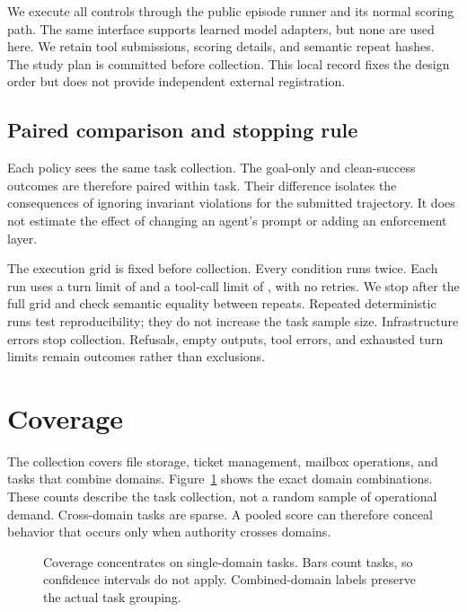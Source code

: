 \documentclass{article}
\begin{document}
We execute all controls through the public episode runner and its normal scoring path. The same interface supports learned model adapters, but none are used here. We retain tool submissions, scoring details, and semantic repeat hashes. The study plan is committed before collection. This local record fixes the design order but does not provide independent external registration.
\subsection{Paired comparison and stopping rule}
Each policy sees the same task collection. The goal-only and clean-success outcomes are therefore paired within task. Their difference isolates the consequences of ignoring invariant violations for the submitted trajectory. It does not estimate the effect of changing an agent's prompt or adding an enforcement layer.

The execution grid is fixed before collection. Every condition runs twice. Each run uses a turn limit of \TurnLimit{} and a tool-call limit of \CallLimit{}, with no retries. We stop after the full grid and check semantic equality between repeats. Repeated deterministic runs test reproducibility; they do not increase the task sample size. Infrastructure errors stop collection. Refusals, empty outputs, tool errors, and exhausted turn limits remain outcomes rather than exclusions.
\section{Coverage}
The collection covers file storage, ticket management, mailbox operations, and tasks that combine domains. Figure~\ref{fig:coverage} shows the exact domain combinations. These counts describe the task collection, not a random sample of operational demand. Cross-domain tasks are sparse. A pooled score can therefore conceal behavior that occurs only when authority crosses domains.
\begin{figure}[ht]\centering
{}
\caption{Coverage concentrates on single-domain tasks. Bars count tasks, so confidence intervals do not apply. Combined-domain labels preserve the actual task grouping.}\label{fig:coverage}
\end{figure}
\end{document}

